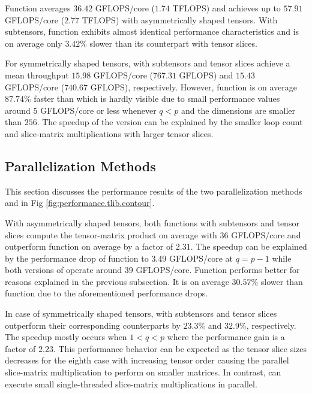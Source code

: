 Function  averages $36.42$ GFLOPS/core ($1.74$ TFLOPS) and achieves up to $57.91$ GFLOPS/core ($2.77$ TFLOPS) with asymmetrically shaped tensors.
With subtensors, function  exhibits almost identical performance characteristics and is on average only $3.42$\% slower than its counterpart with tensor slices.

For symmetrically shaped tensors,  with subtensors and tensor slices achieve a mean throughput $15.98$ GFLOPS/core ($767.31$ GFLOPS) and $15.43$ GFLOPS/core ($740.67$ GFLOPS), respectively.
However, function  is on average $87.74$\% faster than  which is hardly visible due to small performance values around $5$ GFLOPS/core or less whenever $q<p$ and the dimensions are smaller than $256$.
The speedup of the  version can be explained by the smaller loop count and slice-matrix multiplications with larger tensor slices.


\subsection{Parallelization Methods}
This section discusses the performance results of the two parallelization methods  and  in Fig \ref{fig:performance.tlib.contour}.

With asymmetrically shaped tensors, both  functions with subtensors and tensor slices compute the tensor-matrix product on average with $36$ GFLOPS/core and outperform function  on average by a factor of $2.31$.
The speedup can be explained by the performance drop of function  to $3.49$ GFLOPS/core at $q=p-1$ while both versions of  operate around $39$ GFLOPS/core.
Function  performs better for reasons explained in the previous subsection.
It is on average $30.57$\% slower than function  due to the aforementioned performance drops.

In case of symmetrically shaped tensors,  with subtensors and tensor slices outperform their corresponding  counterparts by $23.3$\% and $32.9$\%, respectively.
The speedup mostly occurs when $1<q<p$ where the performance gain is a factor of $2.23$.
This performance behavior can be expected as the tensor slice sizes decreases for the eighth case with increasing tensor order causing the parallel slice-matrix multiplication to perform on smaller matrices.
In contrast,  can execute small single-threaded slice-matrix multiplications in parallel.

